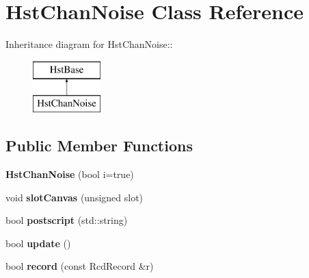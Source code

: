 \section{HstChanNoise Class Reference}
\label{classHstChanNoise}
Inheritance diagram for HstChanNoise::\begin{figure}[H]
\begin{center}
\leavevmode
\includegraphics[height=2cm]{classHstChanNoise}
\end{center}
\end{figure}
\subsection*{Public Member Functions}
\begin{DoxyCompactItemize}
\item 
{\bfseries HstChanNoise} (bool i=true)\label{classHstChanNoise_a586bcb45dc76e29586a3f79bb59bbe8f}

\item 
void {\bfseries slotCanvas} (unsigned slot)\label{classHstChanNoise_a8fb12b44a7564921e59e1300ad8f7ab2}

\item 
bool {\bfseries postscript} (std::string)\label{classHstChanNoise_a2fab50c4976f17c718e7f9cb0ca1694a}

\item 
bool {\bfseries update} ()\label{classHstChanNoise_a33aecd229ce83bb779fc0dab34e80b8b}

\item 
bool {\bfseries record} (const RcdRecord \&r)\label{classHstChanNoise_a188b2650b4d8831ac6f5b0898afa3238}

\end{DoxyCompactItemize}
